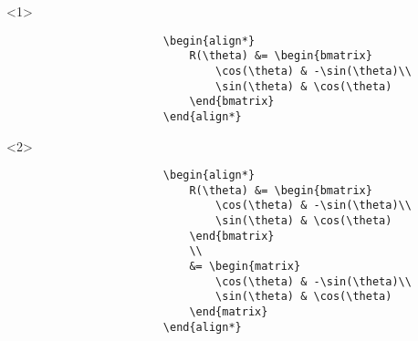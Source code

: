 \begin{frame}[fragile]
\begin{columns}
\begin{column}{0.5\textwidth}
            \begin{adjustbox}{valign=T,set height=0pt,set depth=0.8\textheight,valign=B}%
                \begin{minipage}{0.9\textwidth}%
                    \leavevmode
                \unless\ifishandout
                \begin{onlyenv}<1>
                    \begin{verbatim}
                        \begin{align*}
                            R(\theta) &= \begin{bmatrix}
                                \cos(\theta) & -\sin(\theta)\\
                                \sin(\theta) & \cos(\theta)
                            \end{bmatrix}
                        \end{align*}
                    \end{verbatim}
                \end{onlyenv}%
                \begin{onlyenv}<2>
                    \begin{verbatim}
                        \begin{align*}
                            R(\theta) &= \begin{bmatrix}
                                \cos(\theta) & -\sin(\theta)\\
                                \sin(\theta) & \cos(\theta)
                            \end{bmatrix}
                            \\
                            &= \begin{matrix}
                                \cos(\theta) & -\sin(\theta)\\
                                \sin(\theta) & \cos(\theta)
                            \end{matrix}
                        \end{align*}

\end{verbatim}
\end{onlyenv}
\end{minipage}
\end{adjustbox}
\end{column}
\end{columns}
\end{frame}
